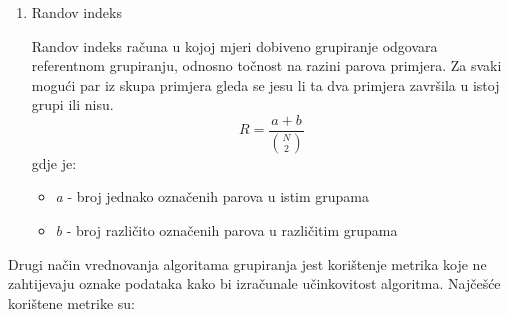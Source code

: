 \documentclass[utf8, diplomski, numeric]{fer}
\begin{document}
\begin{enumerate}
\item Randov indeks

Randov indeks računa u kojoj mjeri dobiveno grupiranje odgovara referentnom grupiranju, odnosno točnost na razini parova primjera. Za svaki mogući par iz skupa primjera gleda se jesu li ta dva primjera
završila u istoj grupi ili nisu.
\begin{equation*} \label{eq:rand}
R =  \frac{a+b}{{N \choose 2}}
\end{equation*}
gdje je:
\begin{itemize}
\item \textit{a} - broj jednako označenih parova u istim grupama
\item \textit{b} - broj različito označenih parova u različitim grupama
\end{itemize}

\end{enumerate}

Drugi način vrednovanja algoritama grupiranja jest korištenje metrika koje ne zahtijevaju oznake podataka kako bi izračunale učinkovitost algoritma. Najčešće korištene metrike su:
\end{document}
